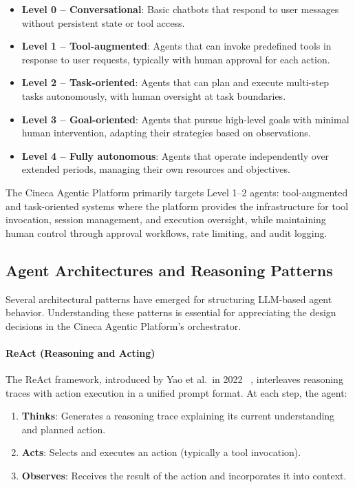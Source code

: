 \documentclass[a4paper,twoside]{sapthesis}
\begin{document}
\begin{itemize}
    \item \textbf{Level 0 -- Conversational}: Basic chatbots that respond to user messages without persistent state or tool access.
    \item \textbf{Level 1 -- Tool-augmented}: Agents that can invoke predefined tools in response to user requests, typically with human approval for each action.
    \item \textbf{Level 2 -- Task-oriented}: Agents that can plan and execute multi-step tasks autonomously, with human oversight at task boundaries.
    \item \textbf{Level 3 -- Goal-oriented}: Agents that pursue high-level goals with minimal human intervention, adapting their strategies based on observations.
    \item \textbf{Level 4 -- Fully autonomous}: Agents that operate independently over extended periods, managing their own resources and objectives.
\end{itemize}

The Cineca Agentic Platform primarily targets Level 1--2 agents: tool-augmented and task-oriented systems where the platform provides the infrastructure for tool invocation, session management, and execution oversight, while maintaining human control through approval workflows, rate limiting, and audit logging.

\subsection{Agent Architectures and Reasoning Patterns}

Several architectural patterns have emerged for structuring LLM-based agent behavior. Understanding these patterns is essential for appreciating the design decisions in the Cineca Agentic Platform's orchestrator.

\paragraph{ReAct (Reasoning and Acting)}
The ReAct framework, introduced by Yao et al.\ in 2022~\cite{yao2022react}
, interleaves reasoning traces with action execution in a unified prompt format. At each step, the agent:
\begin{enumerate}
    \item \textbf{Thinks}: Generates a reasoning trace explaining its current understanding and planned action.
    \item \textbf{Acts}: Selects and executes an action (typically a tool invocation).
    \item \textbf{Observes}: Receives the result of the action and incorporates it into context.
\end{enumerate}
\end{document}
